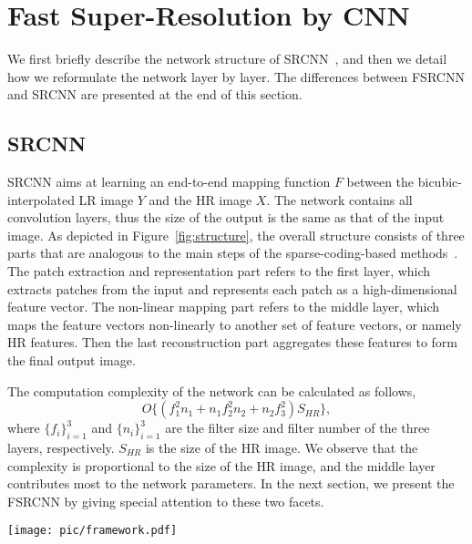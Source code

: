 \documentclass[runningheads]{llncs}
\begin{document}
\section{Fast Super-Resolution by CNN}

We first briefly describe the network structure of SRCNN~\cite{Dong2014,Dong2015}, and then we detail how we reformulate the network layer by layer. The differences between FSRCNN and SRCNN are presented at the end of this section.

\subsection{SRCNN}
SRCNN aims at learning an end-to-end mapping function $F$ between the bicubic-interpolated LR image $Y$ and the HR image $X$. The network contains all convolution layers, thus the size of the output is the same as that of the input image.  As depicted in Figure~\ref{fig:structure}, the overall structure consists of three parts that are analogous to the main steps of the sparse-coding-based methods~\cite{Yang2010a}. The patch extraction and representation part refers to the first layer, which extracts patches from the input and represents each patch as a high-dimensional feature vector. The non-linear mapping part refers to the middle layer, which maps the feature vectors non-linearly to another set of feature vectors, or namely HR features. Then the last reconstruction part aggregates these features to form the final output image.

The computation complexity of the network can be calculated as follows,
\begin{equation}
\label{eqn:computationSRCNN}
O\{(f_1^2 n_1 + n_1  f_2^2  n_2 + n_2 f_3^2) S_{HR}\},
\end{equation}
where $\{f_{i}\}_{i=1}^3$ and $\{n_{i}\}_{i=1}^3$ are the filter size and filter number of the three layers, respectively. $S_{HR}$ is the size of the HR image. We observe that the complexity is proportional to the size of the HR image, and the middle layer contributes most to the network parameters. In the next section, we present the FSRCNN by giving special attention to these two facets.

\begin{figure*}[t]
\centering
  \texttt{[image: pic/framework.pdf]}
\caption{This figure shows the network structures of the SRCNN and FSRCNN. The proposed FSRCNN is different from SRCNN mainly in three aspects. First, FSRCNN adopts the original low-resolution image as input without bicubic interpolation. A deconvolution layer is introduced at the end of the network to perform upsampling. Second, The non-linear mapping step in SRCNN is replaced by three steps in FSRCNN, namely the shrinking, mapping, and expanding step. Third, FSRCNN adopts smaller filter sizes and a deeper network structure. These improvements provide FSRCNN with better performance but lower computational cost than SRCNN.}
  \label{fig:structure}
\end{figure*}
\end{document}
